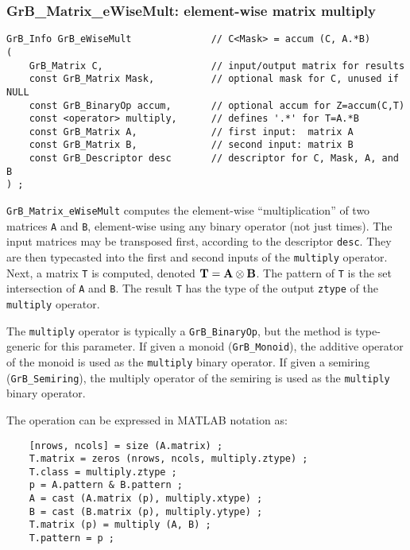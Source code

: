 \documentclass[12pt]{article}
\begin{document}
{\newpage
\subsubsection{{\sf GrB\_Matrix\_eWiseMult:} element-wise matrix multiply}
\label{eWiseMult_matrix}

\begin{mdframed}[userdefinedwidth=6in]
{\footnotesize
\begin{verbatim}
GrB_Info GrB_eWiseMult              // C<Mask> = accum (C, A.*B)
(
    GrB_Matrix C,                   // input/output matrix for results
    const GrB_Matrix Mask,          // optional mask for C, unused if NULL
    const GrB_BinaryOp accum,       // optional accum for Z=accum(C,T)
    const <operator> multiply,      // defines '.*' for T=A.*B
    const GrB_Matrix A,             // first input:  matrix A
    const GrB_Matrix B,             // second input: matrix B
    const GrB_Descriptor desc       // descriptor for C, Mask, A, and B
) ;
\end{verbatim}
} \end{mdframed}

\verb'GrB_Matrix_eWiseMult' computes the element-wise ``multiplication'' of two
matrices \verb'A' and \verb'B', element-wise using any binary operator (not
just times).  The input matrices may be transposed first, according to the
descriptor \verb'desc'.  They are then typecasted into the first and second
inputs of the \verb'multiply' operator.  Next, a matrix \verb'T' is computed,
denoted ${\bf T = A \otimes B}$.  The pattern of \verb'T' is the set
intersection of \verb'A' and \verb'B'.  The result \verb'T' has the type of the
output \verb'ztype' of the \verb'multiply' operator.

The \verb'multiply' operator is typically a \verb'GrB_BinaryOp', but the method
is type-generic for this parameter.  If given a monoid (\verb'GrB_Monoid'), the
additive operator of the monoid is used as the \verb'multiply' binary operator.
If given a semiring (\verb'GrB_Semiring'), the multiply operator of the
semiring is used as the \verb'multiply' binary operator.

\vspace{0.05in}
The operation can be expressed in MATLAB notation as:
    {\footnotesize
    \begin{verbatim}
    [nrows, ncols] = size (A.matrix) ;
    T.matrix = zeros (nrows, ncols, multiply.ztype) ;
    T.class = multiply.ztype ;
    p = A.pattern & B.pattern ;
    A = cast (A.matrix (p), multiply.xtype) ;
    B = cast (B.matrix (p), multiply.ytype) ;
    T.matrix (p) = multiply (A, B) ;
    T.pattern = p ; \end{verbatim} }

}
\end{document}
